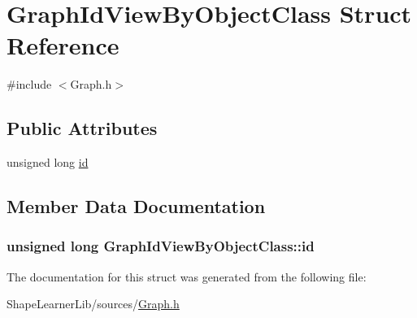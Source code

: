 \hypertarget{struct_graph_id_view_by_object_class}{}\section{Graph\+Id\+View\+By\+Object\+Class Struct Reference}
\label{struct_graph_id_view_by_object_class}


{\ttfamily \#include $<$Graph.\+h$>$}

\subsection*{Public Attributes}
\begin{DoxyCompactItemize}
\item 
unsigned long \hyperlink{struct_graph_id_view_by_object_class_aa71ee180f4455874e5c0bfc274ff11c2}{id}
\end{DoxyCompactItemize}


\subsection{Member Data Documentation}
\hypertarget{struct_graph_id_view_by_object_class_aa71ee180f4455874e5c0bfc274ff11c2}{}
\subsubsection[{id}]{\setlength{\rightskip}{0pt plus 5cm}unsigned long Graph\+Id\+View\+By\+Object\+Class\+::id}\label{struct_graph_id_view_by_object_class_aa71ee180f4455874e5c0bfc274ff11c2}


The documentation for this struct was generated from the following file\+:\begin{DoxyCompactItemize}
\item 
Shape\+Learner\+Lib/sources/\hyperlink{_graph_8h}{Graph.\+h}\end{DoxyCompactItemize}
